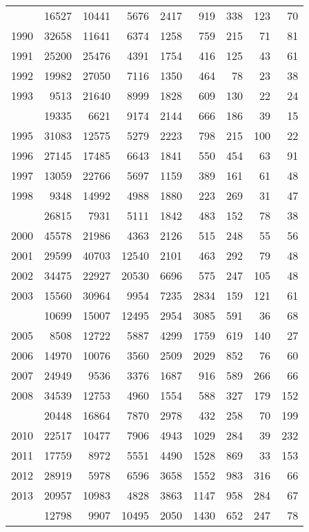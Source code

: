 \documentclass[
]{article}
\begin{document}
\begin{longtable}[t]{lrrrrrrrr}
\endfoot
\bottomrule
\endlastfoot
1989 & 16527 & 10441 & 5676 & 2417 & 919 & 338 & 123 & 70\\
1990 & 32658 & 11641 & 6374 & 1258 & 759 & 215 & 71 & 81\\
1991 & 25200 & 25476 & 4391 & 1754 & 416 & 125 & 43 & 61\\
1992 & 19982 & 27050 & 7116 & 1350 & 464 & 78 & 23 & 38\\
1993 & 9513 & 21640 & 8999 & 1828 & 609 & 130 & 22 & 24\\
\addlinespace
1994 & 19335 & 6621 & 9174 & 2144 & 666 & 186 & 39 & 15\\
1995 & 31083 & 12575 & 5279 & 2223 & 798 & 215 & 100 & 22\\
1996 & 27145 & 17485 & 6643 & 1841 & 550 & 454 & 63 & 91\\
1997 & 13059 & 22766 & 5697 & 1159 & 389 & 161 & 61 & 48\\
1998 & 9348 & 14992 & 4988 & 1880 & 223 & 269 & 31 & 47\\
\addlinespace
1999 & 26815 & 7931 & 5111 & 1842 & 483 & 152 & 78 & 38\\
2000 & 45578 & 21986 & 4363 & 2126 & 515 & 248 & 55 & 56\\
2001 & 29599 & 40703 & 12540 & 2101 & 463 & 292 & 79 & 48\\
2002 & 34475 & 22927 & 20530 & 6696 & 575 & 247 & 105 & 48\\
2003 & 15560 & 30964 & 9954 & 7235 & 2834 & 159 & 121 & 61\\
\addlinespace
2004 & 10699 & 15007 & 12495 & 2954 & 3085 & 591 & 36 & 68\\
2005 & 8508 & 12722 & 5887 & 4299 & 1759 & 619 & 140 & 27\\
2006 & 14970 & 10076 & 3560 & 2509 & 2029 & 852 & 76 & 60\\
2007 & 24949 & 9536 & 3376 & 1687 & 916 & 589 & 266 & 66\\
2008 & 34539 & 12753 & 4960 & 1554 & 588 & 327 & 179 & 152\\
\addlinespace
2009 & 20448 & 16864 & 7870 & 2978 & 432 & 258 & 70 & 199\\
2010 & 22517 & 10477 & 7906 & 4943 & 1029 & 284 & 39 & 232\\
2011 & 17759 & 8972 & 5551 & 4490 & 1528 & 869 & 33 & 153\\
2012 & 28919 & 5978 & 6596 & 3658 & 1552 & 983 & 316 & 66\\
2013 & 20957 & 10983 & 4828 & 3863 & 1147 & 958 & 284 & 67\\
\addlinespace
2014 & 12798 & 9907 & 10495 & 2050 & 1430 & 652 & 247 & 78\\

\end{longtable}
\end{document}
